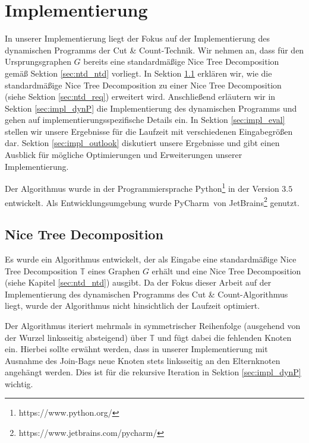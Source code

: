 \chapter{Implementierung}
\label{c:impl}
In unserer Implementierung liegt der Fokus auf der Implementierung des dynamischen Programms der Cut \& Count-Technik. 
Wir nehmen an, dass für den Ursprungsgraphen $G$ bereits eine standardmäßige Nice Tree Decomposition gemäß Sektion \ref{sec:ntd_ntd} vorliegt. 
In Sektion \ref{sec:impl_ntd} erklären wir, wie die standardmäßige Nice Tree Decomposition zu einer Nice Tree Decomposition (siehe Sektion \ref{sec:ntd_req}) erweitert wird. 
Anschließend erläutern wir in Sektion \ref{sec:impl_dynP} die Implementierung des dynamischen Programms und gehen auf implementierungsspezifische Details ein. 
In Sektion \ref{sec:impl_eval} stellen wir unsere Ergebnisse für die Laufzeit mit verschiedenen Eingabegrößen dar.
Sektion \ref{sec:impl_outlook} diskutiert unsere Ergebnisse und gibt einen Ausblick für mögliche Optimierungen und Erweiterungen unserer Implementierung.

Der Algorithmus wurde in der Programmiersprache Python\footnote{https://www.python.org/} in der Version $3.5$ entwickelt. 
Als Entwicklungsumgebung wurde PyCharm\SymbReg ~von JetBrains\footnote{https://www.jetbrains.com/pycharm/} genutzt.
\section{Nice Tree Decomposition}
\label{sec:impl_ntd}
Es wurde ein Algorithmus entwickelt, der als Eingabe eine standardmäßige Nice Tree Decomposition $\mathbb{T}$ eines Graphen $G$ erhält und eine Nice Tree Decomposition (siehe Kapitel \ref{sec:ntd_ntd}) ausgibt. 
Da der Fokus dieser Arbeit auf der Implementierung des dynamischen Programms des Cut \& Count-Algorithmus liegt, wurde der Algorithmus nicht hinsichtlich der Laufzeit optimiert. 

Der Algorithmus iteriert mehrmals in symmetrischer Reihenfolge (ausgehend von der Wurzel linksseitig absteigend) über $\mathbb{T}$ und fügt dabei die fehlenden Knoten ein. 
Hierbei sollte erwähnt werden, dass in unserer Implementierung mit Ausnahme des \glqq Join\grqq -Bags neue Knoten stets linksseitig an den Elternknoten angehängt werden. 
Dies ist für die rekursive Iteration in Sektion \ref{sec:impl_dynP} wichtig.


